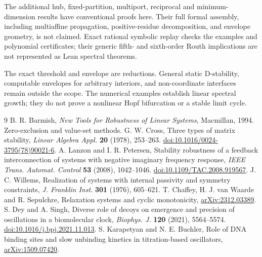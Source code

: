 \documentclass[11pt]{article}
\theoremstyle{remark}\newtheorem{remark}[theorem]{Remark}
\begin{document}
The additional hub, fixed-partition, multiport, reciprocal and
minimum-dimension results have conventional proofs here. Their full formal
assembly, including multiaffine propagation, positive-residue decomposition,
and envelope geometry, is not claimed. Exact rational symbolic replay checks
the examples and polynomial certificates; their generic fifth- and sixth-order
Routh implications are not represented as Lean spectral theorems.

The exact threshold and envelope are reductions. General static D-stability,
computable envelopes for arbitrary interiors, and non-coordinate interfaces
remain outside the scope. The numerical examples establish linear spectral
growth; they do not prove a nonlinear Hopf bifurcation or a stable limit cycle.

\begin{thebibliography}{9}
 B. R. Barmish, \emph{New Tools for Robustness of Linear
Systems}, Macmillan, 1994. Zero-exclusion and value-set methods.
 G. W. Cross, Three types of matrix stability,
\emph{Linear Algebra Appl.} \textbf{20} (1978), 253--263.
\href{https://doi.org/10.1016/0024-3795(78)90021-6}{doi:10.1016/0024-3795(78)90021-6}.
 A. Lanzon and I. R. Petersen, Stability robustness of a
feedback interconnection of systems with negative imaginary frequency
response, \emph{IEEE Trans. Automat. Control} \textbf{53} (2008), 1042--1046.
\href{https://doi.org/10.1109/TAC.2008.919567}{doi:10.1109/TAC.2008.919567}.
 J. C. Willems, Realization of systems with internal
passivity and symmetry constraints, \emph{J. Franklin Inst.}
\textbf{301} (1976), 605--621.
 T. Chaffey, H. J. van Waarde and R. Sepulchre,
Relaxation systems and cyclic monotonicity,
\href{https://arxiv.org/abs/2312.03389}{arXiv:2312.03389}.
 S. Dey and A. Singh, Diverse role of decoys on emergence and
precision of oscillations in a biomolecular clock,
\emph{Biophys. J.} \textbf{120} (2021), 5564--5574.
\href{https://doi.org/10.1016/j.bpj.2021.11.013}{doi:10.1016/j.bpj.2021.11.013}.
 S. Karapetyan and N. E. Buchler, Role of DNA binding
sites and slow unbinding kinetics in titration-based oscillators,
\href{https://arxiv.org/abs/1509.07420}{arXiv:1509.07420}.
\end{thebibliography}
\end{document}
